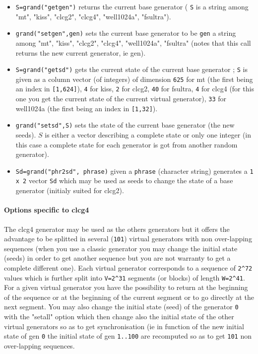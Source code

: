 \begin{itemize}

\item {}  \verb!S=grand("getgen")! returns the current base generator ( \verb!S! is
  a string among "mt", "kiss", "clcg2", "clcg4", "well1024a", "fsultra").
\item {} \verb!grand("setgen",gen)! sets the current base generator to be \verb!gen!
  a string among "mt", "kiss", "clcg2", "clcg4", "well1024a", "fsultra" (notes that this call 
  returns the new current generator, ie gen).
\item {} \verb!S=grand("getsd")! gets the current state of the current base
  generator ; \verb!S! is given as a column vector (of integers) of dimension \verb!625! 
  for mt (the first being an index in \verb![1,624]!), \verb!4! for kiss, \verb!2! 
  for clcg2,  \verb!40! for fsultra, \verb!4! for clcg4 (for this one
  you get the current state of the current virtual generator), \verb!33! for
  well1024a (the first being an index in \verb![1,32]!).
\item {} \verb!grand("setsd",S)! sets the state of the current 
  base generator (the new seeds). $S$ is either a vector describing a
  complete state or only one integer (in this case a complete state for each
  generator is got from another random generator). 
\item {} \verb!Sd=grand("phr2sd", phrase)! given a \verb!phrase! (character string) generates 
  a \verb!1 x 2! vector \verb!Sd! which may be used as seeds to change the state of a 
  base generator (initialy suited for clcg2). 
\end{itemize}

\paragraph{Options specific to clcg4}
The clcg4 generator may be used as the others generators but it offers the advantage 
to be splitted in several (\verb!101!) virtual generators with non over-lapping 
sequences (when you use a classic generator you may change the initial state (seeds) 
in order to get another sequence but you are not warranty to get a complete  different one). 
Each virtual generator corresponds to a sequence of \verb!2^72! values which is 
further split into \verb!V=2^31! segments (or blocks) of length \verb!W=2^41!.
For a given virtual generator you have the possibility to return at the beginning of the 
sequence or at the beginning of the current segment or to go directly at the next segment. 
You may also change the initial state (seed) of the generator \verb!0! with the 
"setall" option which then change also the initial state of the other virtual generators 
so as to get synchronisation (ie in function of the new initial state of gen \verb!0! 
the initial state of gen \verb!1..100! are recomputed so as to get \verb!101! 
non over-lapping sequences.   

